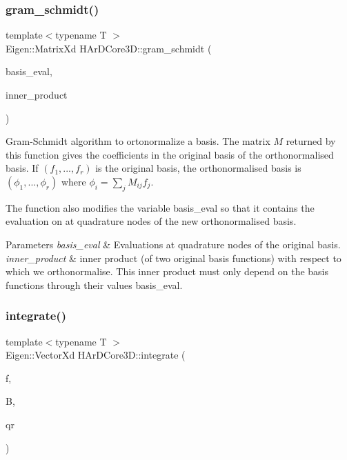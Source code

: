 \subsubsection{\texorpdfstring{gram\+\_\+schmidt()}{gram\_schmidt()}}
{\footnotesize\ttfamily template$<$typename T $>$ \\
Eigen\+::\+Matrix\+Xd H\+Ar\+D\+Core3\+D\+::gram\+\_\+schmidt (\begin{DoxyParamCaption}\item[{boost\+::multi\+\_\+array$<$ T, 2 $>$ \&}]{basis\+\_\+eval,  }\item[{const std\+::function$<$ double(size\+\_\+t, size\+\_\+t)$>$ \&}]{inner\+\_\+product }\end{DoxyParamCaption})}

Gram-\/\+Schmidt algorithm to ortonormalize a basis. The matrix $M$ returned by this function gives the coefficients in the original basis of the orthonormalised basis. If $(f_1,...,f_r)$ is the original basis, the orthonormalised basis is $(\phi_1,...,\phi_r)$ where $\phi_i = \sum_j M_{ij}f_j$.

The function also modifies the variable basis\+\_\+eval so that it contains the evaluation on at quadrature nodes of the new orthonormalised basis. 
\begin{DoxyParams}{Parameters}
{\em basis\+\_\+eval} & Evaluations at quadrature nodes of the original basis. \\
\hline
{\em inner\+\_\+product} & inner product (of two original basis functions) with respect to which we orthonormalise. This inner product must only depend on the basis functions through their values basis\+\_\+eval. \\
\hline
\end{DoxyParams}
\mbox{\label{group__Basis_ga714906e1afa0a6d8475d177b554a7cc0}} 
\subsubsection{\texorpdfstring{integrate()}{integrate()}}
{\footnotesize\ttfamily template$<$typename T $>$ \\
Eigen\+::\+Vector\+Xd H\+Ar\+D\+Core3\+D\+::integrate (\begin{DoxyParamCaption}\item[{const std\+::function$<$ T(const Vector\+Rd \&)$>$ \&}]{f,  }\item[{const boost\+::multi\+\_\+array$<$ T, 2 $>$ \&}]{B,  }\item[{const Quadrature\+Rule \&}]{qr }\end{DoxyParamCaption})}



